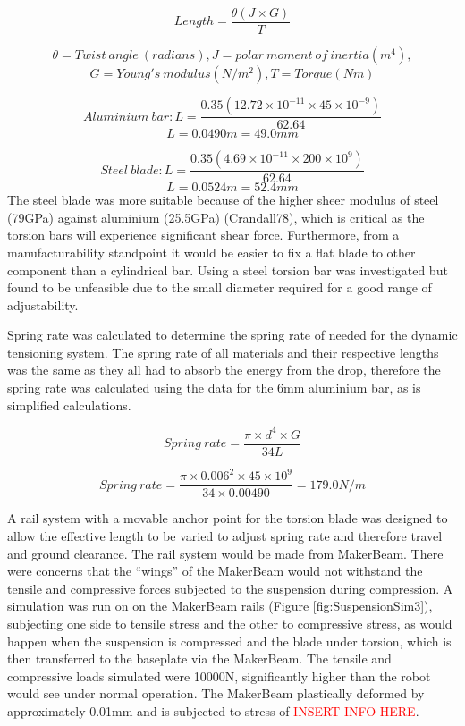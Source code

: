 \begin{equation}
Length = \frac{\theta(J \times G)}{T}
\end{equation}

\[\theta = Twist\:angle\:(radians), J = polar\:moment\:of\:inertia (m^4),\]
\[G = Young's\:modulus (N/m^2), T = Torque (Nm)\]

\[Aluminium\:bar: L = \frac{0.35(12.72\times 10^{-11} \times 45 \times 10^{-9})}{62.64}\]
\[L = 0.0490m = 49.0mm\]

\[Steel\:blade: L = \frac{0.35(4.69\times10^{-11} \times 200 \times 10^{9})}{62.64}\]
\[L = 0.0524m = 52.4mm\]
The steel blade was more suitable because of the higher sheer modulus of steel (79GPa) against aluminium (25.5GPa) (Crandall78), which is critical as the torsion bars will experience significant shear force. Furthermore, from a manufacturability standpoint it would be easier to fix a flat blade to other component than a cylindrical bar. Using a steel torsion bar was investigated but found to be unfeasible due to the small diameter required for a good range of adjustability.

Spring rate was calculated to determine the spring rate of needed for the dynamic tensioning system. The spring rate of all materials and their respective lengths was the same as they all had to absorb the energy from the drop, therefore the spring rate was calculated using the data for the 6mm aluminium bar, as is simplified calculations.

\begin{equation}
Spring\:rate = \frac{\pi \times d^4 \times G}{34L}
\end{equation}

\[Spring\: rate = \frac{\pi \times 0.006^2 \times 45\times10^{9}}{34\times 0.00490} = 179.0 N/m\]

A rail system with a movable anchor point for the torsion blade was designed to allow the effective length to be varied to adjust spring rate and therefore travel and ground clearance. The rail system would be made from MakerBeam. There were concerns that the “wings” of the MakerBeam would not withstand the tensile and compressive forces subjected to the suspension during compression. A simulation was run on on the MakerBeam rails (Figure \ref{fig:SuspensionSim3}), subjecting one side to tensile stress and the other to compressive stress, as would happen when the suspension is compressed and the blade under torsion, which is then transferred to the baseplate via the MakerBeam. The tensile and compressive loads simulated were 10000N, significantly higher than the robot would see under normal operation. The MakerBeam plastically deformed by approximately 0.01mm and is subjected to stress of \textcolor{red}{INSERT INFO HERE}.

